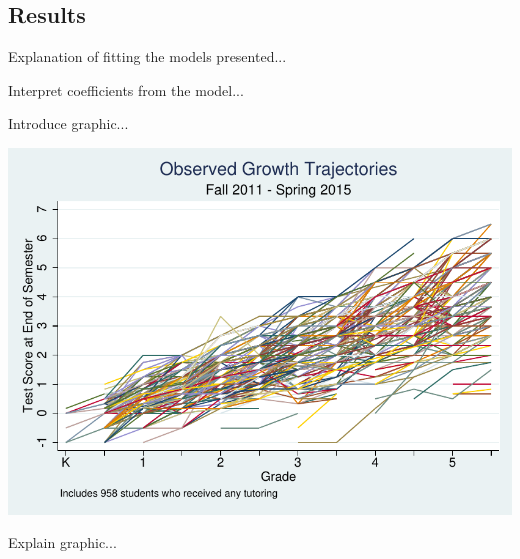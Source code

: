 \documentclass[a0,landscape]{a0poster}
\begin{document}
\begin{multicols}{3}

\color{NavyBlue}

\section*{Results}

Explanation of fitting the models presented...
%
\color{Black}
\begin{center}\vspace{1cm}

\end{center}\vspace{1cm}
\color{NavyBlue}
%   

Interpret coefficients from the model...

\color{NavyBlue}

Introduce graphic...

\begin{center}\vspace{1cm}
\includegraphics[width=0.8\linewidth]{xtline.pdf}
\end{center}\vspace{1cm}

Explain graphic...


\color{SaddleBrown} %


\end{multicols}
\end{document}
